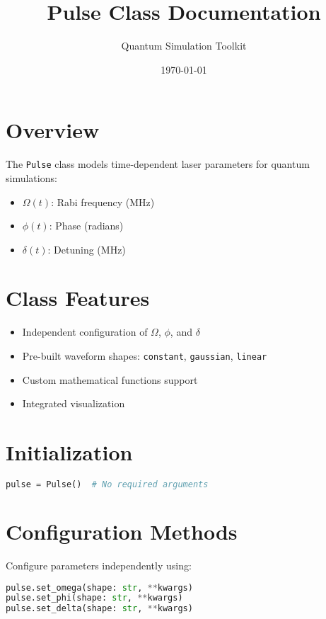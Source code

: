 \documentclass{article}
\title{Pulse Class Documentation}
\author{Quantum Simulation Toolkit}
\date{\today}
\begin{document}
\maketitle

\section{Overview}
The \texttt{Pulse} class models time-dependent laser parameters for quantum simulations:
\begin{itemize}
    \item \(\Omega(t)\): Rabi frequency (MHz)
    \item \(\phi(t)\): Phase (radians)
    \item \(\delta(t)\): Detuning (MHz)
\end{itemize}

\section{Class Features}
\begin{itemize}
    \item Independent configuration of \(\Omega\), \(\phi\), and \(\delta\)
    \item Pre-built waveform shapes: \texttt{constant}, \texttt{gaussian}, \texttt{linear}
    \item Custom mathematical functions support
    \item Integrated visualization
\end{itemize}

\section{Initialization}
\begin{lstlisting}[language=Python]
pulse = Pulse()  # No required arguments
\end{lstlisting}

\section{Configuration Methods}
Configure parameters independently using:
\begin{lstlisting}[language=Python]
pulse.set_omega(shape: str, **kwargs)
pulse.set_phi(shape: str, **kwargs)
pulse.set_delta(shape: str, **kwargs)
\end{lstlisting}
\end{document}
